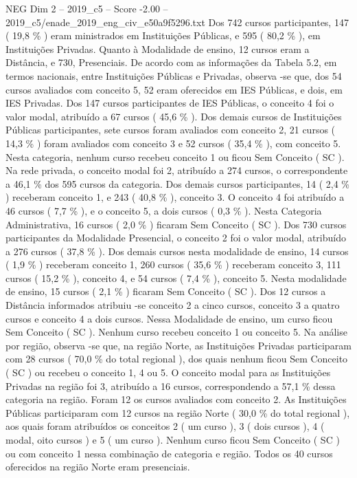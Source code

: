 \begin{textsample}{NEG Dim 2 – 2019\_c5 – Score -2.00 – 2019\_c5/enade\_2019\_eng\_civ\_e50a9f5296.txt}
Dos 742 cursos participantes, 147 ( 19,8 \% ) eram ministrados em Instituições Públicas, e 595 ( 80,2 \% ), em Instituições Privadas.
Quanto à Modalidade de ensino, 12 cursos eram a Distância, e 730, Presenciais.
De acordo com as informações da Tabela 5.2, em termos nacionais, entre Instituições Públicas e Privadas, observa -se que, dos 54 cursos avaliados com conceito 5, 52 eram oferecidos em IES Públicas, e dois, em IES Privadas.
Dos 147 cursos participantes de IES Públicas, o conceito 4 foi o valor modal, atribuído a 67 cursos ( 45,6 \% ).
Dos demais cursos de Instituições Públicas participantes, sete cursos foram avaliados com conceito 2, 21 cursos ( 14,3 \% ) foram avaliados com conceito 3 e 52 cursos ( 35,4 \% ), com conceito 5.
Nesta categoria, nenhum curso recebeu conceito 1 ou ficou Sem Conceito ( SC ).
Na rede privada, o conceito modal foi 2, atribuído a 274 cursos, o correspondente a 46,1 \% dos 595 cursos da categoria.
Dos demais cursos participantes, 14 ( 2,4 \% ) receberam conceito 1, e 243 ( 40,8 \% ), conceito 3.
O conceito 4 foi atribuído a 46 cursos ( 7,7 \% ), e o conceito 5, a dois cursos ( 0,3 \% ).
Nesta Categoria Administrativa, 16 cursos ( 2,0 \% ) ficaram Sem Conceito ( SC ).
Dos 730 cursos participantes da Modalidade Presencial, o conceito 2 foi o valor modal, atribuído a 276 cursos ( 37,8 \% ).
Dos demais cursos nesta modalidade de ensino, 14 cursos ( 1,9 \% ) receberam conceito 1, 260 cursos ( 35,6 \% ) receberam conceito 3, 111 cursos ( 15,2 \% ), conceito 4, e 54 cursos ( 7,4 \% ), conceito 5.
Nesta modalidade de ensino, 15 cursos ( 2,1 \% ) ficaram Sem Conceito ( SC ).
Dos 12 cursos a Distância informados atribuiu -se conceito 2 a cinco cursos, conceito 3 a quatro cursos e conceito 4 a dois cursos.
Nessa Modalidade de ensino, um curso ficou Sem Conceito ( SC ).
Nenhum curso recebeu conceito 1 ou conceito 5.
Na análise por região, observa -se que, na região Norte, as Instituições Privadas participaram com 28 cursos ( 70,0 \% do total regional ), dos quais nenhum ficou Sem Conceito ( SC ) ou recebeu o conceito 1, 4 ou 5.
O conceito modal para as Instituições Privadas na região foi 3, atribuído a 16 cursos, correspondendo a 57,1 \% dessa categoria na região.
Foram 12 os cursos avaliados com conceito 2.
As Instituições Públicas participaram com 12 cursos na região Norte ( 30,0 \% do total regional ), aos quais foram atribuídos os conceitos 2 ( um curso ), 3 ( dois cursos ), 4 ( modal, oito cursos ) e 5 ( um curso ).
Nenhum curso ficou Sem Conceito ( SC ) ou com conceito 1 nessa combinação de categoria e região.
Todos os 40 cursos oferecidos na região Norte eram presenciais.

\end{textsample}
